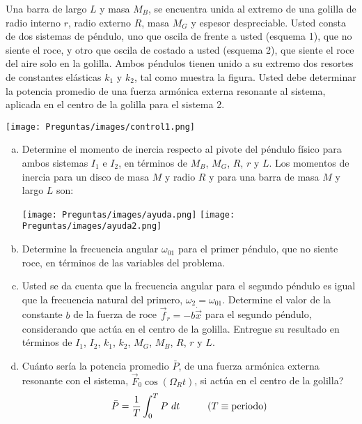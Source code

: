 \item Una barra de largo \(L\) y masa \(M_B\), se encuentra unida al extremo de una golilla de radio interno \(r\), radio externo \(R\), masa \(M_G\) y espesor despreciable. Usted consta de dos sistemas de p\'endulo, uno que oscila de frente a usted (esquema 1), que no siente el roce, y otro que oscila de costado a usted (esquema 2), que siente el roce del aire solo en la golilla. Ambos p\'endulos tienen unido a su extremo dos resortes de constantes el\'asticas \(k_1\) y \(k_2\), tal como muestra la figura. Usted debe determinar la potencia promedio de una fuerza arm\'onica externa resonante al sistema, aplicada en el centro de la golilla para el sistema 2.
		\begin{center}
			\texttt{[image: Preguntas/images/control1.png]}
		\end{center}
		
	\begin{enumerate}[a)]
		\item Determine el momento de inercia respecto al pivote del p\'endulo f\'isico para ambos sistemas \(I_1\) e \(I_2\), en t\'erminos de \(M_B\), \(M_G\), \(R\), \(r\) y \(L\). Los momentos de inercia para un disco de masa \(M\) y radio \(R\) y para una barra de masa \(M\) y largo \(L\) son:
		\begin{center}
			\texttt{[image: Preguntas/images/ayuda.png]} \hspace{20mm} \texttt{[image: Preguntas/images/ayuda2.png]}
		\end{center}
		\item Determine la frecuencia angular \(\omega_{01}\) para el primer p\'endulo, que no siente roce, en t\'erminos de las variables del problema.
		\item Usted se da cuenta que la frecuencia angular para el segundo p\'endulo es igual que la frecuencia natural del primero, \(\omega_2 = \omega_{01}\). Determine el valor de la constante \(b\) de la fuerza de roce \(\vec{f}_r=-b\dot{\vec{x}}\) para el segundo p\'endulo, considerando que act\'ua en el centro de la golilla. Entregue su resultado en t\'erminos de \(I_1\), \(I_2\), \(k_1\), \(k_2\), \(M_G\), \(M_B\), \(R\), \(r\) y \(L\).
		

		
		\item \textquestiondown Cu\'anto ser\'ia la potencia promedio \(\bar{P}\), de una fuerza arm\'onica externa resonante con el sistema, \(\vec{F}_0 \cos(\Omega_R t)\), si act\'ua en el centro de la golilla?
		\begin{equation*}
			\bar{P} = \dfrac{1}{T} \int_0^T P \ dt \hspace{10mm} (T \equiv \text{periodo})
		\end{equation*}
		
		
		
		
	\end{enumerate}


